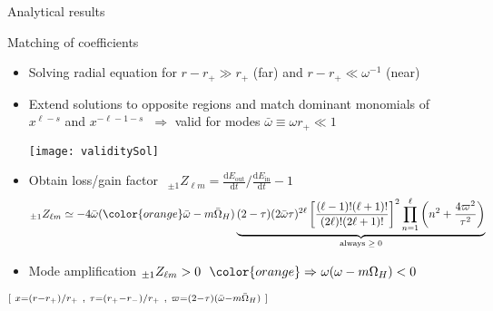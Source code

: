 \documentclass[9pt]{beamer}
\newcommand{\dd}{\mathrm{d}}
\newcommand{\uu}[3][]{ {}_{#1} #2_{#3} }
\begin{document}
\begin{frame}{Analytical results}
	
	\begin{block}{Matching of coefficients}
		\begin{itemize}
			\setlength\itemsep{0.6em}
			\item Solving radial equation for $r - r_+ \gg r_+$ (far) and $r - r_+ \ll \omega^{-1}$ (near)
			
			\item Extend solutions to opposite regions and match dominant monomials of $x^{\ell-s}$ and $x^{-\ell-1-s}$ $~\Rightarrow$ valid for modes $\bar{\omega}\equiv \omega r_+ \ll 1$
			\begin{center}
				\texttt{[image: validitySol]}
			\end{center}	
		
			\item Obtain loss/gain factor $~\boxed{\displaystyle ~{}_{\pm 1}Z_{\ell m} = \frac{\dd E_\mathrm{out}}{\dd t}\bigg/\frac{\dd E_\mathrm{in}}{\dd t} - 1~}$
			\begin{align*}
				\uu[\pm1]{Z}{\ell m} \simeq  - 4 \bar{\omega} ({\color{orange}\bar{\omega} - m \bar{\Omega}_H}) \underbrace{(2-\tau)(2\bar{\omega} \tau)^{2\ell} \left[\frac{(\ell-1)! (\ell+1)!}{(2\ell)! (2\ell+1)!}\right]^2 \prod_{n=1}^{\ell} \left(n^2 + \frac{4 \varpi^2}{\tau^2} \right)}_\text{always $\ge 0$}
			\end{align*}
			
			\item Mode amplification $\uu[\pm1]{Z}{\ell m}>0 ~~{\color{orange}\Rightarrow}~ \omega (\omega - m \Omega_H) < 0$  
		\end{itemize}
		$\scriptstyle \hfill [~ x = (r-r_{+})/r_{+} ~,~ \tau = (r_{+}-r_{-})/r_{+} ~,~ \varpi = (2-\tau)(\bar{\omega} - m \bar{\Omega}_H) ~]$
	\end{block}
	
\end{frame}
\end{document}
